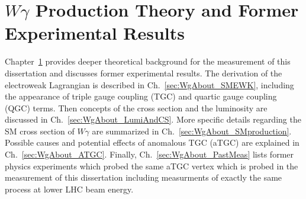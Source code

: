 \chapter{$W\gamma$ Production Theory and Former Experimental Results} %
\label{sec:WgAbout}

Chapter~\ref{sec:WgAbout} provides deeper theoretical background for the measurement of this dissertation and discusses former experimental results. The derivation of the electroweak Lagrangian is described in Ch.~\ref{sec:WgAbout_SMEWK}, including the appearance of triple gauge coupling (TGC) and quartic gauge coupling (QGC) terms. Then concepts of the cross section and the luminosity are discussed in Ch.~\ref{sec:WgAbout_LumiAndCS}. More specific details regarding the SM cross section of $W\gamma$ are summarized in Ch.~\ref{sec:WgAbout_SMproduction}. Possible causes and potential effects of anomalous TGC (aTGC) are explained in Ch.~\ref{sec:WgAbout_ATGC}. Finally, Ch.~\ref{sec:WgAbout_PastMeas} lists former physics experiments which probed the same aTGC vertex which is probed in the measurement of this dissertation including measurments of exactly the same process at lower LHC beam energy.

